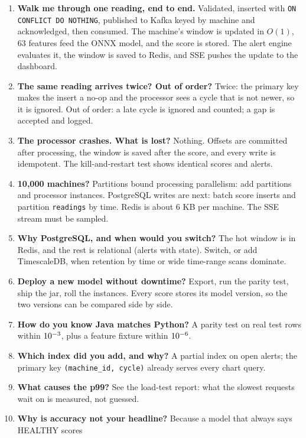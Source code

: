 \documentclass[11pt,a4paper]{article}
\begin{document}
\begin{enumerate}[leftmargin=*]
\item \textbf{Walk me through one reading, end to end.} Validated, inserted with \texttt{ON CONFLICT DO NOTHING},
published to Kafka keyed by machine and acknowledged, then consumed. The machine's window is updated in $O(1)$,
63 features feed the ONNX model, and the score is stored. The alert engine evaluates it, the window is saved to
Redis, and SSE pushes the update to the dashboard.
\item \textbf{The same reading arrives twice? Out of order?} Twice: the primary key makes the insert a no-op and
the processor sees a cycle that is not newer, so it is ignored. Out of order: a late cycle is ignored and
counted; a gap is accepted and logged.
\item \textbf{The processor crashes. What is lost?} Nothing. Offsets are committed after processing, the window is
saved after the score, and every write is idempotent. The kill-and-restart test shows identical scores and alerts.
\item \textbf{10,000 machines?} Partitions bound processing parallelism: add partitions and processor instances.
PostgreSQL writes are next: batch score inserts and partition \texttt{readings} by time. Redis is about 6 KB per
machine. The SSE stream must be sampled.
\item \textbf{Why PostgreSQL, and when would you switch?} The hot window is in Redis, and the rest is relational
(alerts with state). Switch, or add TimescaleDB, when retention by time or wide time-range scans dominate.
\item \textbf{Deploy a new model without downtime?} Export, run the parity test, ship the jar, roll the
instances. Every score stores its model version, so the two versions can be compared side by side.
\item \textbf{How do you know Java matches Python?} A parity test on \ParityRows{} real test rows within
$10^{-3}$, plus a feature fixture within $10^{-6}$.
\item \textbf{Which index did you add, and why?} A partial index on open alerts; the primary key
\texttt{(machine\_id, cycle)} already serves every chart query.
\item \textbf{What causes the p99?} See the load-test report: what the slowest requests wait on is measured,
not guessed.
\item \textbf{Why is accuracy not your headline?} Because a model that always says HEALTHY scores

\end{enumerate}
\end{document}
